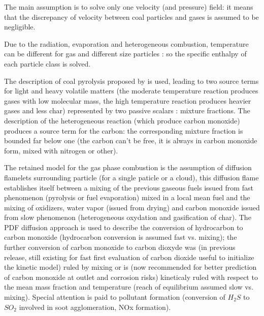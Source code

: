 The main assumption is to solve only one velocity (and pressure) field: it
means that the discrepancy of velocity between coal particles and
gases is assumed to be negligible.

Due to the radiation, evaporation and heterogeneous combustion, temperature can
be different for gas and different size particles : so the specific enthalpy of
each particle class is solved.

The description of coal pyrolysis proposed by \cite{Kobayashi:1976} is used, leading to two
source terms for light and heavy volatile matters (the moderate temperature
reaction produces gases with low molecular mass, the high temperature reaction
produces heavier gases and less char) represented by two passive scalars :
mixture fractions.  The description of the heterogeneous reaction (which produce
carbon monoxide) produces a source term for the carbon: the corresponding
mixture fraction is bounded far below one (the carbon can't be free, it is
always in carbon monoxide form, mixed with nitrogen or other).

The retained model for the gas phase combustion is the assumption of diffusion
flamelets surrounding particle (for a single paticle or a cloud), this
diffusion flame establishes itself between a mixing of the previous gaseous fuels
issued from fast phenomenon (pyrolysis or fuel evaporation) mixed in a local
mean fuel and the mixing of oxidizers, water vapor (issued from drying) and
carbon monoxide issued from slow phenomenon (heterogeneous oxydation and
gasification of char). The PDF diffusion approach is used to describe the
conversion of hydrocarbon to carbon monoxide (hydrocarbon conversion is assumed
fast vs. mixing); the further conversion of carbon monoxide to carbon dioxyde
was (in previous release, still existing for fast first evaluation of carbon
dioxide useful to initialize the kinetic model) ruled by mixing or is (now
recommended for better prediction of carbon monoxide at outlet and corrosion
risks) kineticaly ruled with respect to the mean mass fraction and temperature
(reach of equilibrium assumed slow vs. mixing). Special attention is paid to
pollutant formation (conversion of $H_{2}S$ to $SO_{2}$ involved in soot
agglomeration, NOx formation).

\newpage
